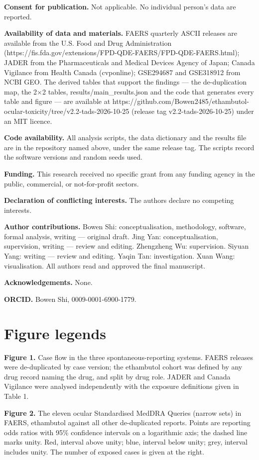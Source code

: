 \documentclass[12pt,a4paper]{article}
\begin{document}
\textbf{Consent for publication.} Not applicable. No individual person's data are reported.

\textbf{Availability of data and materials.} FAERS quarterly ASCII releases are available from the U.S. Food and Drug Administration (https://fis.fda.gov/extensions/FPD-QDE-FAERS/FPD-QDE-FAERS.html); JADER from the Pharmaceuticals and Medical Devices Agency of Japan; Canada Vigilance from Health Canada (cvponline); GSE294687 and GSE318912 from NCBI GEO. The derived tables that support the findings — the de-duplication map, the 2×2 tables, results/main\_results.json and the code that generates every table and figure — are available at https://github.com/Bowen2485/ethambutol-ocular-toxicity/tree/v2.2-tads-2026-10-25 (release tag v2.2-tads-2026-10-25) under an MIT licence.

\textbf{Code availability.} All analysis scripts, the data dictionary and the results file are in the repository named above, under the same release tag. The scripts record the software versions and random seeds used.

\textbf{Funding.} This research received no specific grant from any funding agency in the public, commercial, or not-for-profit sectors.

\textbf{Declaration of conflicting interests.} The authors declare no competing interests.

\textbf{Author contributions.} Bowen Shi: conceptualisation, methodology, software, formal analysis, writing — original draft. Jing Yan: conceptualisation, supervision, writing — review and editing. Zhengzheng Wu: supervision. Siyuan Yang: writing — review and editing. Yaqin Tan: investigation. Xuan Wang: visualisation. All authors read and approved the final manuscript.

\textbf{Acknowledgements.} None.

\textbf{ORCID.} Bowen Shi, 0009-0001-6900-1779.

\section*{Figure legends}

\textbf{Figure 1.} Case flow in the three spontaneous-reporting systems. FAERS releases were de-duplicated by case version; the ethambutol cohort was defined by any drug record naming the drug, and split by drug role. JADER and Canada Vigilance were analysed independently with the exposure definitions given in Table 1.

\textbf{Figure 2.} The eleven ocular Standardised MedDRA Queries (narrow sets) in FAERS, ethambutol against all other de-duplicated reports. Points are reporting odds ratios with 95\% confidence intervals on a logarithmic axis; the dashed line marks unity. Red, interval above unity; blue, interval below unity; grey, interval includes unity. The number of exposed cases is given at the right.
\end{document}

